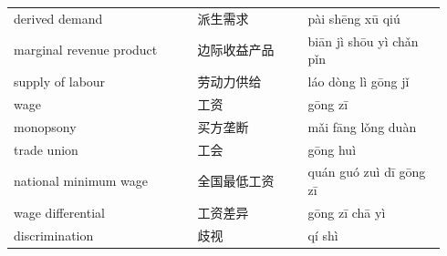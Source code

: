 \documentclass[11pt]{article}
\begin{document}
\begin{longtable}{@{}p{0.40\linewidth}p{0.24\linewidth}p{0.30\linewidth}@{}}
derived demand & 派生需求 & pài shēng xū qiú \\
marginal revenue product & 边际收益产品 & biān jì shōu yì chǎn pǐn \\
supply of labour & 劳动力供给 & láo dòng lì gōng jǐ \\
wage & 工资 & gōng zī \\
monopsony & 买方垄断 & mǎi fāng lǒng duàn \\
trade union & 工会 & gōng huì \\
national minimum wage & 全国最低工资 & quán guó zuì dī gōng zī \\
wage differential & 工资差异 & gōng zī chā yì \\
discrimination & 歧视 & qí shì \\
\end{longtable}
\end{document}
